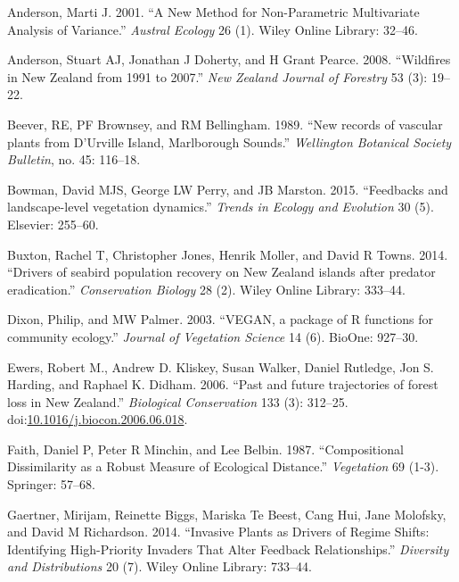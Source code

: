 \hypertarget{refs}{}
\hypertarget{ref-anderson2001new}{}
Anderson, Marti J. 2001. ``A New Method for Non-Parametric Multivariate
Analysis of Variance.'' \emph{Austral Ecology} 26 (1). Wiley Online
Library: 32--46.

\hypertarget{ref-anderson2008wildfires}{}
Anderson, Stuart AJ, Jonathan J Doherty, and H Grant Pearce. 2008.
``Wildfires in New Zealand from 1991 to 2007.'' \emph{New Zealand
Journal of Forestry} 53 (3): 19--22.

\hypertarget{ref-beever1989new}{}
Beever, RE, PF Brownsey, and RM Bellingham. 1989. ``New records of
vascular plants from D'Urville Island, Marlborough Sounds.''
\emph{Wellington Botanical Society Bulletin}, no. 45: 116--18.

\hypertarget{ref-bowman2015feedbacks}{}
Bowman, David MJS, George LW Perry, and JB Marston. 2015. ``Feedbacks
and landscape-level vegetation dynamics.'' \emph{Trends in Ecology and
Evolution} 30 (5). Elsevier: 255--60.

\hypertarget{ref-buxton2014drivers}{}
Buxton, Rachel T, Christopher Jones, Henrik Moller, and David R Towns.
2014. ``Drivers of seabird population recovery on New Zealand islands
after predator eradication.'' \emph{Conservation Biology} 28 (2). Wiley
Online Library: 333--44.

\hypertarget{ref-dixon2003vegan}{}
Dixon, Philip, and MW Palmer. 2003. ``VEGAN, a package of R functions
for community ecology.'' \emph{Journal of Vegetation Science} 14 (6).
BioOne: 927--30.

\hypertarget{ref-Ewers2006}{}
Ewers, Robert M., Andrew D. Kliskey, Susan Walker, Daniel Rutledge, Jon
S. Harding, and Raphael K. Didham. 2006. ``Past and future trajectories
of forest loss in New Zealand.'' \emph{Biological Conservation} 133 (3):
312--25.
doi:\href{https://doi.org/10.1016/j.biocon.2006.06.018}{10.1016/j.biocon.2006.06.018}.

\hypertarget{ref-faith1987compositional}{}
Faith, Daniel P, Peter R Minchin, and Lee Belbin. 1987. ``Compositional
Dissimilarity as a Robust Measure of Ecological Distance.''
\emph{Vegetation} 69 (1-3). Springer: 57--68.

\hypertarget{ref-gaertner2014invasive}{}
Gaertner, Mirijam, Reinette Biggs, Mariska Te Beest, Cang Hui, Jane
Molofsky, and David M Richardson. 2014. ``Invasive Plants as Drivers of
Regime Shifts: Identifying High-Priority Invaders That Alter Feedback
Relationships.'' \emph{Diversity and Distributions} 20 (7). Wiley Online
Library: 733--44.

